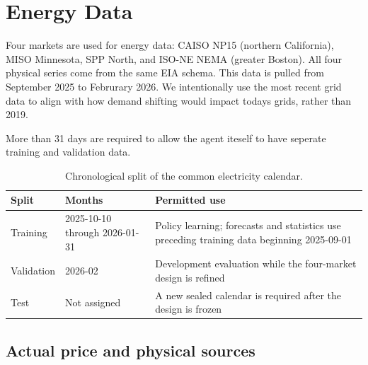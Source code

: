 \documentclass[12pt]{article}
\begin{document}
\section{Energy Data}
\label{sec:energy-data}

Four markets are used for energy data: CAISO NP15 (northern California), MISO Minnesota, SPP North, and ISO-NE NEMA (greater Boston). All four physical series come from the same EIA schema. This data is pulled from September 2025 to Februrary 2026. We intentionally use the most recent grid data to align with how demand shifting would impact todays grids, rather than 2019.

More than 31 days are required to allow the agent iteself to have seperate training and validation data.

\begin{table}[htbp]
  \centering
  \caption{Chronological split of the common electricity calendar.}
  \label{tab:energy-calendar}
  \begin{tabular}{@{}L{0.13\textwidth}L{0.23\textwidth}L{0.54\textwidth}@{}}
    \toprule
    Split & Months & Permitted use \\
    \midrule
    Training
      & 2025-10-10 through 2026-01-31
      & Policy learning; forecasts and statistics use preceding training data
        beginning 2025-09-01 \\
    Validation
      & 2026-02
      & Development evaluation while the four-market design is refined \\
    Test
      & Not assigned
      & A new sealed calendar is required after the design is frozen \\
    \bottomrule
  \end{tabular}
\end{table}

\subsection{Actual price and physical sources}
\label{subsec:energy-sources}
\end{document}
